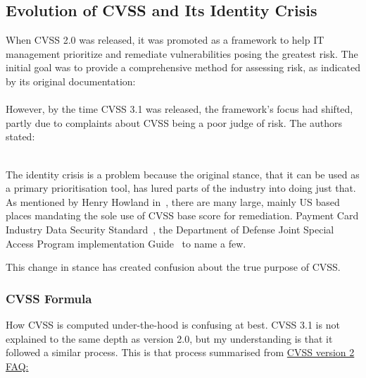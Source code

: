 \documentclass[12pt]{article}
\begin{document}
\subsection{Evolution of CVSS and Its Identity Crisis}

When CVSS 2.0 was released, it was promoted as a framework to help IT management prioritize and
remediate vulnerabilities posing the greatest risk. The initial goal was to provide a comprehensive
method for assessing risk, as indicated by its original documentation:
\\

\textit{}~\cite{CVSS_2}
\\

However, by the time CVSS 3.1 was released, the framework's focus had shifted, partly due to
complaints about CVSS being a poor judge of risk. The authors stated:

\textit{}~\cite{CVSS_31}
\\

The identity crisis is a problem because the original stance, that it can be used as a primary
prioritisation tool, has lured parts of the industry into doing just that. As mentioned by Henry
Howland in~\cite{ubiquitous}, there are many large, mainly US based places mandating the sole use of
CVSS base score for remediation. Payment Card Industry Data Security Standard~\cite{PCI}, the
Department of Defense Joint Special Access Program implementation Guide~\cite{DOD} to name a few.

This change in stance has created confusion about the true purpose of CVSS.

\subsubsection{CVSS Formula}


How CVSS is computed under-the-hood is confusing at best. CVSS 3.1 is not explained to the same
depth as version 2.0, but my understanding is that it followed a similar process. This is that
process summarised from
\href{https://www.first.org/cvss/v2/faq#Explanation-of-CVSS-v2-formula-and-metric-valued-development}{CVSS
	version 2 FAQ:}~\cite{CVSS_formula}
\end{document}
